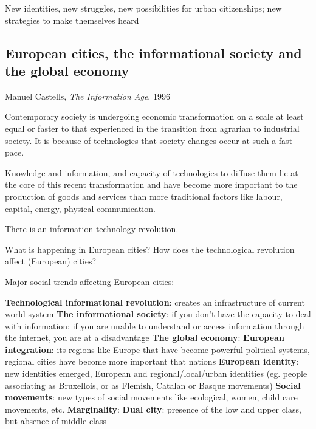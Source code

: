 \documentclass{article}
\begin{document}
\begin{outline}
	\1 New identities, new struggles, new possibilities for urban citizenships; new strategies to make themselves heard
\end{outline}

\subsection{European cities, the informational society and the global economy}

Manuel Castells, \textit{The Information Age}, 1996

Contemporary society is undergoing economic transformation on a scale at least equal or faster to that experienced in the transition from agrarian to industrial society.
It is because of technologies that society changes occur at such a fast pace.

Knowledge and information, and capacity of technologies to diffuse them lie at the core of this recent transformation and have become more important to the production of goods and services than more traditional factors like labour, capital, energy, physical communication.

There is an information technology revolution.

What is happening in European cities? How does the technological revolution affect (European) cities?

Major social trends affecting European cities:

\begin{outline}
	\1 \textbf{Technological informational revolution}: creates an infrastructure of current world system
	\1 \textbf{The informational society}: if you don't have the capacity to deal with information; if you are unable to understand or access information through the internet, you are at a disadvantage
	\1 \textbf{The global economy}:
	\1 \textbf{European integration}: its regions like Europe that have become powerful political systems, regional cities have become more important that nations
	\1 \textbf{European identity}: new identities emerged, European and regional/local/urban identities (eg. people associating as Bruxellois, or as Flemish, Catalan or Basque movements)
	\1 \textbf{Social movements}: new types of social movements like ecological, women, child care movements, etc.
	\1 \textbf{Marginality}:
	\1 \textbf{Dual city}: presence of the low and upper class, but absence of middle class
\end{outline}
\end{document}
